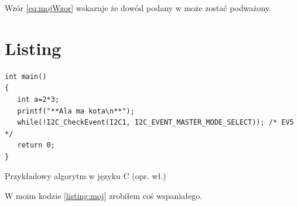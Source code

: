 Wzór \ref{eq:mojWzor} wskazuje że dowód podany w \cite{kaleta_experimental_2005} może zostać podważony. \lipsum[9]

\section{Listing}

\begin{listing}
\begin{verbatim} 
int main()
{
   int a=2*3;
   printf("**Ala ma kota\n**");
   while(!I2C_CheckEvent(I2C1, I2C_EVENT_MASTER_MODE_SELECT)); /* EV5 */
   return 0;
}
\end{verbatim}
\caption{Przykładowy algorytm w języku C (opr. wł.)} \label{listing:moj}
\end{listing}

W moim kodzie \ref{listing:moj} zrobiłem coś wspaniałego. \lipsum[4]
